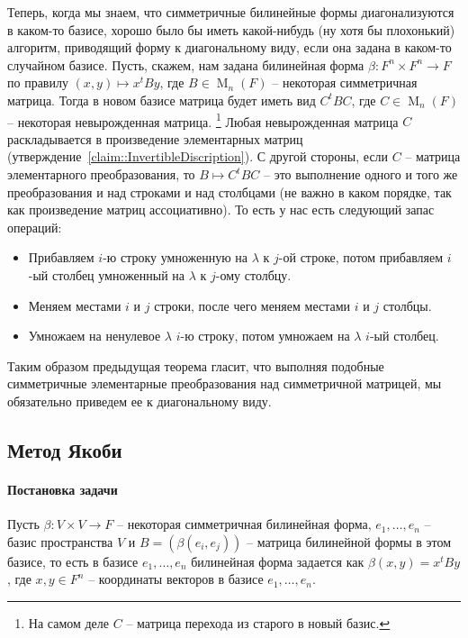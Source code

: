 Теперь, когда мы знаем, что симметричные билинейные формы диагонализуются в каком-то базисе, хорошо было бы иметь какой-нибудь (ну хотя бы плохонький) алгоритм, приводящий форму к диагональному виду, если она задана в каком-то случайном базисе.
Пусть, скажем, нам задана билинейная форма $\beta\colon F^n \times F^n\to F$ по правилу $(x,y)\mapsto x^t By$, где $B\in \operatorname{M}_n(F)$ -- некоторая симметричная матрица.
Тогда в  новом базисе матрица будет иметь вид $C^t B C$, где $C\in \operatorname{M}_n(F)$ -- некоторая невырожденная матрица.%
\footnote{На самом деле $C$ -- матрица перехода из старого в новый базис.}
Любая невырожденная матрица $C$ раскладывается в произведение элементарных матриц (утверждение~\ref{claim::InvertibleDiscription}).
С другой стороны, если $C$ -- матрица элементарного преобразования, то $B \mapsto C^tBC$ -- это выполнение одного и того же преобразования и над строками и над столбцами (не важно в каком порядке, так как произведение матриц ассоциативно).
То есть у нас есть следующий запас операций:
\begin{itemize}
\item Прибавляем $i$-ю строку умноженную на $\lambda$ к $j$-ой строке, потом прибавляем $i$-ый столбец умноженный на $\lambda$ к $j$-ому столбцу.

\item Меняем местами $i$ и $j$ строки, после чего меняем местами $i$ и $j$ столбцы.

\item Умножаем на ненулевое $\lambda$ $i$-ю строку, потом умножаем на $\lambda$ $i$-ый столбец.
\end{itemize}
Таким образом предыдущая теорема гласит, что выполняя подобные симметричные элементарные преобразования над симметричной матрицей, мы обязательно приведем ее к диагональному виду.

\subsection{Метод Якоби}
\label{subsection::Jacoby}

\paragraph{Постановка задачи}

Пусть $\beta\colon V\times V\to F$ -- некоторая симметричная билинейная форма, $e_1,\ldots,e_n$ -- базис пространства $V$ и $B = (\beta(e_i, e_j))$ -- матрица билинейной формы в этом базисе, то есть в базисе $e_1,\ldots,e_n$ билинейная форма задается как $\beta(x, y) = x^t B y$, где $x,y\in F^n$ -- координаты векторов в базисе $e_1,\ldots,e_n$.

